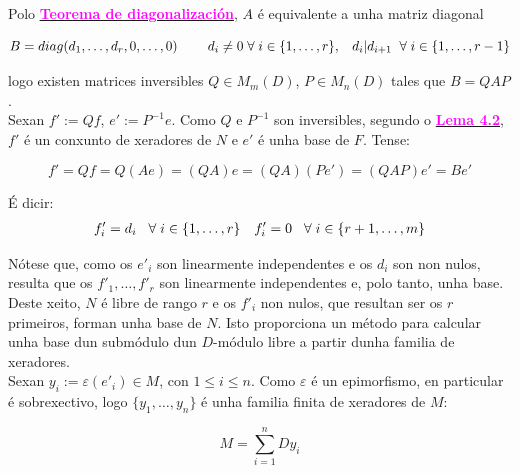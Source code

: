 \documentclass[twoside]{report}
\newcommand{\magbf}[1]{\textcolor{magenta}{\textbf{#1}}} %
\theoremstyle{mystyle}
\begin{document}
\noindent Polo \hyperref[th4.1]{\magbf{Teorema de diagonalización}}, $A$ é equivalente a unha matriz diagonal

$$B = diag(d_{1}, \dots, d_{r}, 0, \dots, 0) \hspace{8mm} d_{i} \neq 0 \hspace{1mm} \forall \hspace{1mm} i \in \{1, \dots, r\}, \hspace{3mm} d_{i} | d_{i+1} \hspace{2mm} \forall \hspace{1mm} i \in \{1, \dots, r-1\}$$

\noindent logo existen matrices inversibles $Q \in M_{m}(D)$, $P \in M_{n}(D)$ tales que $B = QAP$.\\

\noindent Sexan $f' := Qf$, $e' := P^{-1}e$. Como $Q$ e $P^{-1}$ son inversibles, segundo o \hyperref[lem4.2]{\magbf{Lema 4.2}}, $f'$ é un conxunto de xeradores de $N$ e $e'$ é unha base de $F$. Tense:

$$f' = Qf = Q(Ae) = (QA)e = (QA)(Pe') = (QAP)e' = Be'$$

\pagebreak

\noindent É dicir:
\begin{align*}
 f'_{i} = d_{i} \hspace{3mm} \forall \hspace{1mm} i \in \{1, \dots, r\} & & f'_{i} = 0 \hspace{3mm} \forall \hspace{1mm} i \in \{r+1, \dots, m\} 
\end{align*}

\vspace{3mm}

\noindent Nótese que, como os $e'_{i}$ son linearmente independentes e os $d_{i}$ son non nulos, resulta que os $f'_{1}, \dots, f'_{r}$ son linearmente independentes e, polo tanto, unha base. Deste xeito, $N$ é libre de rango $r$ e os $f'_{i}$ non nulos, que resultan ser os $r$ primeiros, forman unha base de $N$. Isto proporciona un método para calcular unha base dun submódulo dun $D$-módulo libre a partir dunha familia de xeradores.\\

\noindent Sexan $y_{i} := \varepsilon(e'_{i}) \in M$, con $1 \leq i \leq n$. Como $\varepsilon$ é un epimorfismo, en particular é sobrexectivo, logo $\{y_{1}, \dots, y_{n}\}$ é unha familia finita de xeradores de $M$:

\begin{equation}\label{ec4.1}
    M = \displaystyle \sum_{i = 1}^{n}Dy_{i}
\end{equation}
\end{document}
